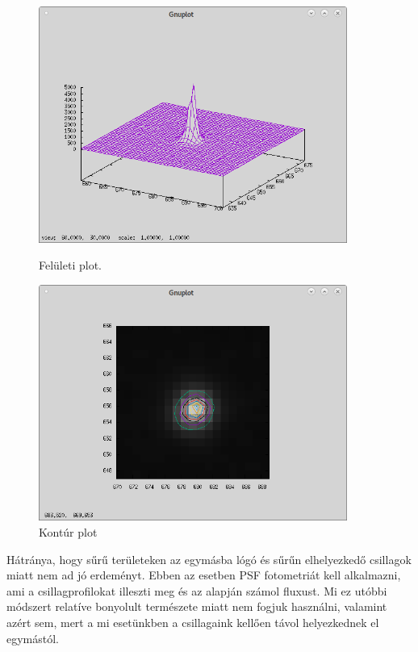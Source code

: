 \documentclass{article}
\begin{document}
\begin{figure}[ht!]
    \centering
    \begin{minipage}{0.45\textwidth}
        \centering
        \includegraphics[width=0.9\textwidth]{pics/surface.png} %
        \caption{Felületi plot.}
        \label{surfaceplot}
    \end{minipage}\hfill
    \begin{minipage}{0.45\textwidth}
        \centering
        \includegraphics[width=0.9\textwidth]{pics/area.png} %
        \caption{Kontúr plot}
        \label{areap}
    \end{minipage}
\end{figure}

Hátránya, hogy sűrű területeken az egymásba lógó és sűrűn elhelyezkedő
csillagok miatt nem ad jó erdeményt. Ebben az esetben PSF fotometriát kell
alkalmazni, ami a csillagprofilokat illeszti meg és az alapján számol fluxust.
Mi ez utóbbi módszert relatíve bonyolult természete miatt nem fogjuk használni,
valamint azért sem, mert a mi esetünkben a csillagaink kellően távol
helyezkednek el egymástól.
\end{document}
